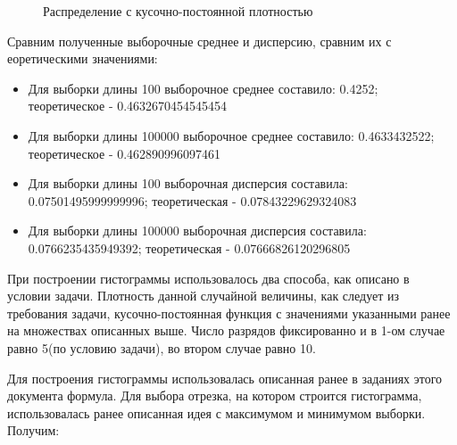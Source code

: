 \documentclass{article}
\begin{document}
\begin{figure}[h]
{}
\caption{Распределение с кусочно-постоянной плотностью}
\label{fig:image}
\end{figure}

Сравним полученные выборочные среднее и дисперсию, сравним их с еоретическими значениями:
\begin{itemize}
    \item Для выборки длины 100 выборочное среднее составило: 0.4252; теоретическое - 0.4632670454545454
    \item Для выборки длины 100000 выборочное среднее составило: 0.4633432522;
        теоретическое - 0.462890996097461
    \item Для выборки длины 100 выборочная дисперсия составила: 0.07501495999999996;
        теоретическая - 0.07843229629324083
    \item Для выборки длины 100000 выборочная дисперсия составила: 0.0766235435949392;
        теоретическая - 0.07666826120296805
\end{itemize}

При построении гистограммы использовалось два способа, как описано в условии задачи. 
Плотность данной случайной величины, как следует из требования задачи, кусочно-постоянная функция с
значениями указанными ранее на множествах описанных выше. Число разрядов фиксированно и в 1-ом
случае равно 5(по условию задачи), во втором случае равно 10.

Для построения гистограммы использовалась описанная ранее в заданиях этого документа формула.
Для выбора отрезка, на котором строится гистограмма, использовалась ранее описанная идея с
максимумом и минимумом выборки. Получим:
\end{document}
